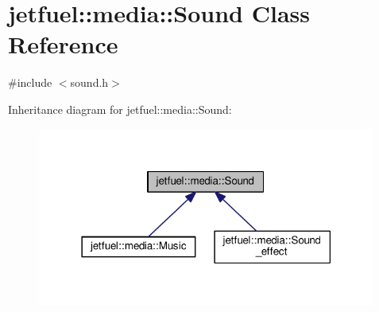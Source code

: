 \hypertarget{classjetfuel_1_1media_1_1Sound}{}\section{jetfuel\+:\+:media\+:\+:Sound Class Reference}
\label{classjetfuel_1_1media_1_1Sound}


{\ttfamily \#include $<$sound.\+h$>$}



Inheritance diagram for jetfuel\+:\+:media\+:\+:Sound\+:
\nopagebreak
\begin{figure}[H]
\begin{center}
\leavevmode
\includegraphics[width=314pt]{classjetfuel_1_1media_1_1Sound__inherit__graph}
\end{center}
\end{figure}
